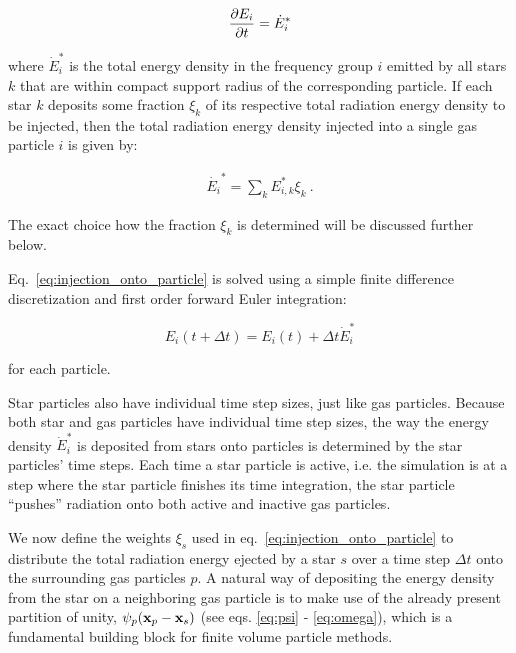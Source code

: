 \begin{equation*}
    \frac{\partial E_i}{\partial t} = \dot{E}_i^* \label{eq:solve-dEdt}
\end{equation*}

where $\dot{E}_i^*$ is the total energy density in the frequency group $i$ emitted by all stars $k$
that are within compact support radius of the corresponding particle. If each star $k$ deposits
some fraction $\xi_k$ of its respective total radiation energy density to be injected,
then the total radiation energy density injected into a single gas particle $i$ is given by:

\begin{align}
    \dot{E_i}^* = \sum_k E_{i,k}^* \xi_k \label{eq:injection_onto_particle} \ .
\end{align}

The exact choice how the fraction $\xi_k$ is determined will be discussed further below.

Eq.~\ref{eq:injection_onto_particle} is solved using a simple finite difference
discretization and first order forward Euler integration:

\begin{equation}
    E_i(t + \Delta t) = E_i(t) + \Delta t \dot{E}_i^*
\end{equation}

for each particle.

Star particles also have individual time step sizes, just like gas particles. Because both star
and gas particles have individual time step sizes, the way the energy density $\dot{E}_i^*$ is
deposited from stars onto particles is determined by the star particles' time steps. Each time a
star particle is active, i.e. the simulation is at a step where the star particle finishes its time
integration, the star particle ``pushes'' radiation onto both active and inactive gas particles.



We now define the weights $\xi_s$ used in eq.~\ref{eq:injection_onto_particle} to distribute the
total radiation energy ejected by a star $s$ over a time step $\Delta t$ onto the surrounding gas
particles $p$.
A natural way of depositing the energy density from the star on a neighboring gas particle is to
make use of the already present partition of unity, $\psi_p(\mathbf{x}_p - \mathbf{x}_s)$ (see eqs. \ref{eq:psi} -
\ref{eq:omega}), which is a fundamental building block for finite volume particle methods.


